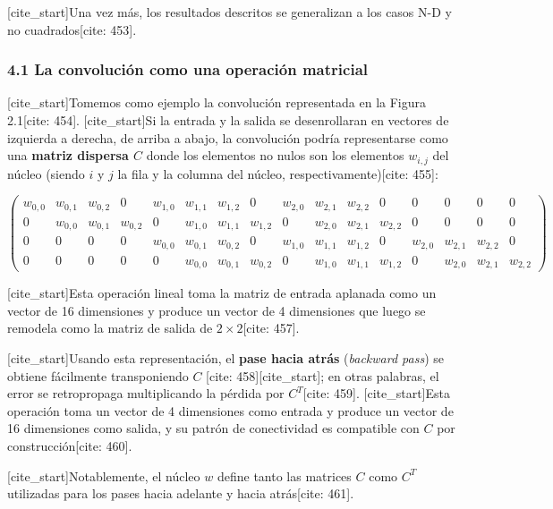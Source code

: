 \documentclass[
  super,
  preprint,
  3p]{elsarticle}
\begin{document}
{[}cite\_start{]}Una vez más, los resultados descritos se generalizan a
los casos N-D y no cuadrados{[}cite: 453{]}.

\subsubsection{4.1 La convolución como una operación
matricial}\label{la-convoluciuxf3n-como-una-operaciuxf3n-matricial}

{[}cite\_start{]}Tomemos como ejemplo la convolución representada en la
Figura 2.1{[}cite: 454{]}. {[}cite\_start{]}Si la entrada y la salida se
desenrollaran en vectores de izquierda a derecha, de arriba a abajo, la
convolución podría representarse como una \textbf{matriz dispersa \(C\)}
donde los elementos no nulos son los elementos \(w_{i,j}\) del núcleo
(siendo \(i\) y \(j\) la fila y la columna del núcleo,
respectivamente){[}cite: 455{]}:

\[
\begin{pmatrix}
w_{0,0} & w_{0,1} & w_{0,2} & 0 & w_{1,0} & w_{1,1} & w_{1,2} & 0 & w_{2,0} & w_{2,1} & w_{2,2} & 0 & 0 & 0 & 0 & 0 \\
0 & w_{0,0} & w_{0,1} & w_{0,2} & 0 & w_{1,0} & w_{1,1} & w_{1,2} & 0 & w_{2,0} & w_{2,1} & w_{2,2} & 0 & 0 & 0 & 0 \\
0 & 0 & 0 & 0 & w_{0,0} & w_{0,1} & w_{0,2} & 0 & w_{1,0} & w_{1,1} & w_{1,2} & 0 & w_{2,0} & w_{2,1} & w_{2,2} & 0 \\
0 & 0 & 0 & 0 & 0 & w_{0,0} & w_{0,1} & w_{0,2} & 0 & w_{1,0} & w_{1,1} & w_{1,2} & 0 & w_{2,0} & w_{2,1} & w_{2,2}
\end{pmatrix}
\]

{[}cite\_start{]}Esta operación lineal toma la matriz de entrada
aplanada como un vector de 16 dimensiones y produce un vector de 4
dimensiones que luego se remodela como la matriz de salida de
\(2 \times 2\){[}cite: 457{]}.

{[}cite\_start{]}Usando esta representación, el \textbf{pase hacia
atrás} (\emph{backward pass}) se obtiene fácilmente transponiendo \(C\)
{[}cite: 458{]}{[}cite\_start{]}; en otras palabras, el error se
retropropaga multiplicando la pérdida por \(C^T\){[}cite: 459{]}.
{[}cite\_start{]}Esta operación toma un vector de 4 dimensiones como
entrada y produce un vector de 16 dimensiones como salida, y su patrón
de conectividad es compatible con \(C\) por construcción{[}cite: 460{]}.

{[}cite\_start{]}Notablemente, el núcleo \(w\) define tanto las matrices
\(C\) como \(C^T\) utilizadas para los pases hacia adelante y hacia
atrás{[}cite: 461{]}.
\end{document}
